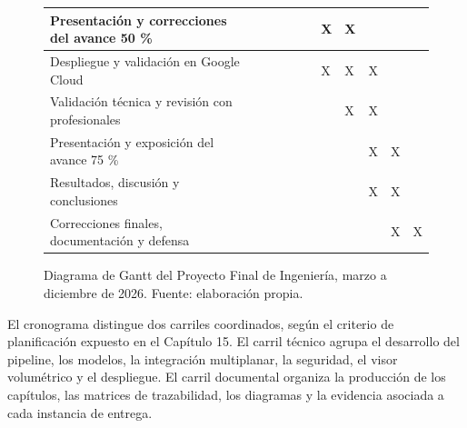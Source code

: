 \begin{figure}[H]
\begin{adjustbox}{max width=\textwidth}
\begin{tabular}{|>{\raggedright\arraybackslash}p{}|*{10}{>{\centering\arraybackslash}p{}|}}
\hline
Presentación y correcciones del avance 50 \% &  &  &  &  &  & X & X &  &  &  \\
\hline
Despliegue y validación en Google Cloud &  &  &  &  &  & X & X & X &  &  \\
\hline
Validación técnica y revisión con profesionales &  &  &  &  &  &  & X & X &  &  \\
\hline
Presentación y exposición del avance 75 \% &  &  &  &  &  &  &  & X & X &  \\
\hline
Resultados, discusión y conclusiones &  &  &  &  &  &  &  & X & X &  \\
\hline
Correcciones finales, documentación y defensa &  &  &  &  &  &  &  &  & X & X \\
\hline
\end{tabular}
\end{adjustbox}
\caption{Diagrama de Gantt del Proyecto Final de Ingeniería, marzo a diciembre de 2026. Fuente: elaboración propia.}
\label{fig:anexo-a-gantt}
\end{figure}

El cronograma distingue dos carriles coordinados, según el criterio de planificación expuesto en el Capítulo 15. El carril técnico agrupa el desarrollo del pipeline, los modelos, la integración multiplanar, la seguridad, el visor volumétrico y el despliegue. El carril documental organiza la producción de los capítulos, las matrices de trazabilidad, los diagramas y la evidencia asociada a cada instancia de entrega.

